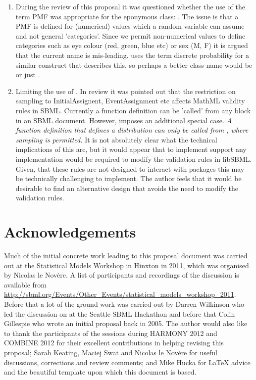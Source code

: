 \documentclass[draftspec]{sbmlpkgspec}
\begin{document}
\begin{enumerate}
\item During the review of this proposal it was questioned whether the
  use of the term PMF was appropriate for the eponymous \distribshort
  class: . The issue is that a PMF is defined
  for (numerical) values which a random variable can assume and not
  general 'categories'. Since we permit non-numerical values to define
  categories such as eye colour (red, green, blue etc) or sex (M, F)
  it is argued that the current name is mis-leading. \uncertml uses
  the term discrete probability for a similar construct that describes
  this, so perhaps a better class name would be
   or just
  .

\item Limiting the use of . In review it was
  pointed out that the restriction on sampling to InitialAssignent,
  EventAssignment etc affects MathML validity rules in SBML. Currently
  a function definition can be 'called' from any \mathml block in an
  SBML document. However, \distribshort imposes an additional special
  case. \emph{A function definition that defines a distribution can
    only be called from \mathml, where sampling is permitted.} It is
  not absolutely clear what the technical implications of this are,
  but it would appear that to implement \distribshort support any
  implementation would be required to modify the \mathml validation
  rules in libSBML. Given, that these rules are not designed to
  interact with packages this may be technically challenging to
  implement. The author feels that it would be desirable to find an
  alternative design that avoids the need to modify the \mathml
  validation rules.
\end{enumerate}

\section{Acknowledgements}
\label{sec:acknowledgements}

Much of the initial concrete work leading to this proposal document
was carried out at the Statistical Models Workshop in Hinxton in 2011,
which was organised by Nicolas le Nov\`{e}re. A list of participants
and recordings of the discussion is available from
\url{http://sbml.org/Events/Other_Events/statistical_models_workshop_2011}.
Before that a lot of the ground work was carried out by Darren
Wilkinson who led the discussion on \distribshort at the Seattle SBML
Hackathon and before that Colin Gillespie who wrote an initial
proposal back in 2005. The author would also like to thank the
participants of the \distribshort sessions during HARMONY 2012 and
COMBINE 2012 for their excellent contributions in helping revising
this proposal; Sarah Keating, Maciej Swat and Nicolas le Nov\`{e}re
for useful discussions, corrections and review comments; and Mike
Hucka for \LaTeX{} advice and the beautiful template upon which this
document is based.
\end{document}
